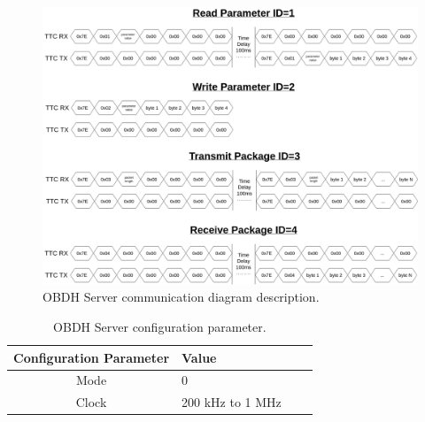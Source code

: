 \begin{figure}[!ht]
    \begin{center}
        \includegraphics[width=1\textwidth]{figures/obdh_communication.drawio.png}
        \caption{OBDH Server communication diagram description.}
        \label{fig:obdh-server-communication}
    \end{center}
\end{figure}

\begin{table}[!ht]
    \centering
    \begin{tabular}{clll}
        \toprule[1.5pt]
        \textbf{Configuration Parameter} & \textbf{Value}\\
        \midrule
        Mode                & 0                 \\
        Clock               & 200 kHz to 1 MHz  \\
        \bottomrule[1.5pt]
    \end{tabular}
    \caption{OBDH Server configuration parameter.}
    \label{tab:eps_config}
\end{table}